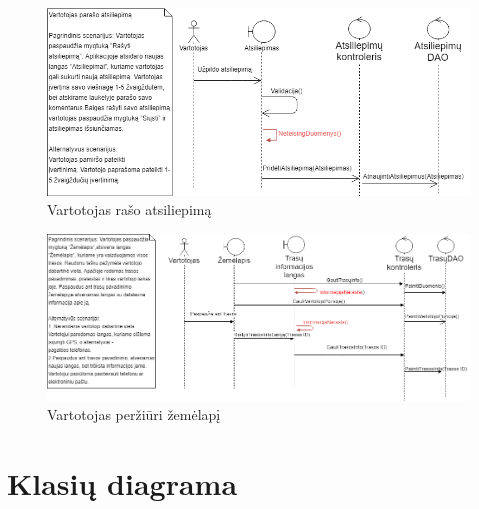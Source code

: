 \documentclass[oneside]{VUMIFPSkursinis}
\begin{document}
			\begin{figure}[h]
    				\centering
    				\includegraphics[width=1\textwidth]{seq12.png}
    				\caption{Vartotojas rašo atsiliepimą}
    				\label{fig:Vartotojas rašo atsiliepimą}
			\end{figure}

			\begin{figure}[h]
    				\centering
    				\includegraphics[width=1\textwidth]{seq13.png}
    				\caption{Vartotojas peržiūri žemėlapį}
    				\label{fig:Vartotojas peržiūri žemėlapį}
			\end{figure}

\section{Klasių diagrama}
\end{document}
